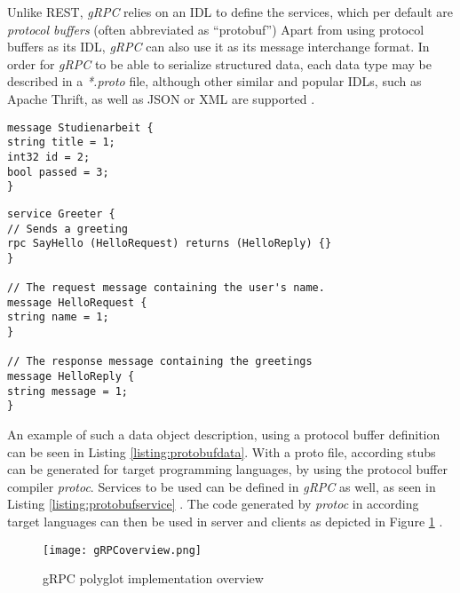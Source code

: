 Unlike \ac{REST}, \textit{gRPC} relies on an \ac{IDL} to define the services, which per default are \textit{protocol buffers} (often abbreviated as \enquote{protobuf})
Apart from using protocol buffers as its \ac{IDL}, \textit{gRPC} can also use it as its message interchange format.
In order for \textit{gRPC} to be able to serialize structured data, each data type may be described in a \textit{*.proto} file, although other similar and popular \acp{IDL}, such as Apache Thrift, as well as \ac{JSON} or \ac{XML} are supported \cite{gRPCAuthors.25.05.2020b}\cite{gRPCAuthors.25.05.2020d}. \\

\begin{lstlisting}[caption=Example of data structure in a \textit{*.proto} file, label=listing:protobufdata]
message Studienarbeit {
string title = 1;
int32 id = 2;
bool passed = 3;
}
\end{lstlisting}

\begin{lstlisting}[caption=Example of service definition in a \textit{*.proto} file, label=listing:protobufservice]
service Greeter {
// Sends a greeting
rpc SayHello (HelloRequest) returns (HelloReply) {}
}

// The request message containing the user's name.
message HelloRequest {
string name = 1;
}

// The response message containing the greetings
message HelloReply {
string message = 1;
}
\end{lstlisting}

An example of such a data object description, using a protocol buffer definition can be seen in Listing \ref{listing:protobufdata}.
With a proto file, according stubs can be generated for target programming languages, by using the protocol buffer compiler \textit{protoc}.
Services to be used can be defined in \textit{gRPC} as well, as seen in Listing \ref{listing:protobufservice} \cite{gRPCAuthors.25.05.2020b}\cite{gRPCAuthors.25.05.2020c}.
The code generated by \textit{protoc} in according target languages can then be used in server and clients as depicted in Figure \ref{img:grpcoverview} \cite{gRPCAuthors.25.05.2020b}.

\begin{figure}[hb]
	\centering
	\texttt{[image: gRPCoverview.png]}
	\caption{gRPC polyglot implementation overview}
	\label{img:grpcoverview}
\end{figure}

